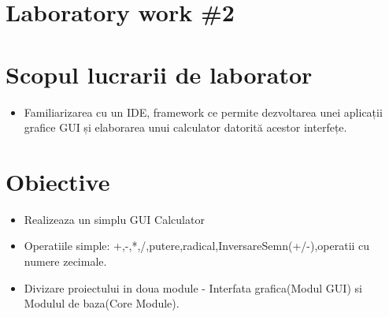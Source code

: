 \section*{Laboratory work \#2}

\section{Scopul lucrarii de laborator}

\begin{itemize}
 \item Familiarizarea cu un IDE, framework ce permite dezvoltarea unei aplicații grafice GUI și elaborarea unui calculator datorită acestor interfețe.
 
\end{itemize}

\section{Obiective}

\begin{itemize}
 \item Realizeaza un simplu GUI Calculator
 \item Operatiile simple: +,-,*,/,putere,radical,InversareSemn(+/-),operatii cu numere zecimale.
 \item Divizare proiectului in doua module - Interfata grafica(Modul GUI) si Modulul de baza(Core Module).
\end{itemize}

\clearpage